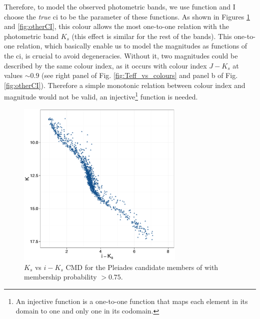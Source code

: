 Therefore, to model the observed photometric bands, we use function and I choose the \emph{true} \gls{ci} to be the parameter of these functions. As shown in Figures \ref{fig:CI} and \ref{fig:otherCI}, this colour allows the most one-to-one relation with the photometric band $K_s$ (this effect is similar for the rest of the bands). This one-to-one relation, which basically enable us to model the magnitudes as functions of the \gls{ci}, is crucial to avoid degeneracies. Without it, two magnitudes could be described by the same colour index, as it occurs with colour index $J- K_s$ at values $\sim0.9$ (see right panel of Fig. \ref{fig:Teff_vs_colours} and panel b of Fig. \ref{fig:otherCI}). Therefore a simple monotonic relation between colour index and magnitude would not be valid, an injective\footnote{An injective function is a one-to-one function that maps each element in its domain to one and only one in its codomain.} function is needed. 

\begin{figure}[ht!]
\begin{center}
\includegraphics[page=1,height=8cm]{background/Figures/CIs.pdf}
\caption{$K_s$ vs $i-K_s$ CMD for the Pleiades candidate members of \citet{Bouy2015} with membership probability $>0.75$.}
\label{fig:CI}
\end{center}
\end{figure}

